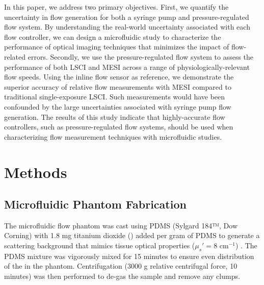 \documentclass[12pt]{spieman}
\begin{document}
\begin{spacing}{2}
In this paper, we address two primary objectives. First, we quantify the uncertainty in flow generation for both a syringe pump and pressure-regulated flow system. By understanding the real-world uncertainty associated with each flow controller, we can design a microfluidic study to characterize the performance of optical imaging techniques that minimizes the impact of flow-related errors. Secondly, we use the pressure-regulated flow system to assess the performance of both LSCI and MESI across a range of physiologically-relevant flow speeds. Using the inline flow sensor as reference, we demonstrate the superior accuracy of relative flow measurements with MESI compared to traditional single-exposure LSCI. Such measurements would have been confounded by the large uncertainties associated with syringe pump flow generation. The results of this study indicate that highly-accurate flow controllers, such as pressure-regulated flow systems, should be used when characterizing flow measurement techniques with microfluidic studies.


\section{Methods}
\label{sect:methods}

\subsection{Microfluidic Phantom Fabrication}
\label{sect:methods_phantom}
The microfluidic flow phantom was cast using PDMS (Sylgard 184™, Dow Corning) with 1.8 mg titanium dioxide () added per gram of PDMS to generate a scattering background that mimics tissue optical properties ($\mu_s' = 8$ cm$^{-1}$) \cite{Parthasarathy:2008el,Yaroslavsky:2002tg}. The PDMS  mixture was vigorously mixed for 15 minutes to ensure even distribution of the  in the phantom. Centrifugation (3000 g relative centrifugal force, 10 minutes) was then performed to de-gas the sample and remove any  clumps.


\end{spacing}
\end{document}
